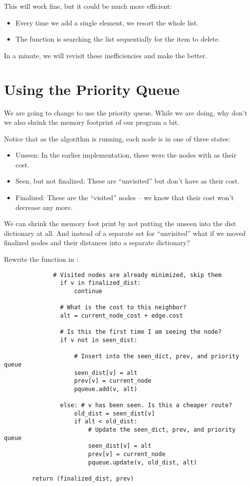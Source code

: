 This will work fine, but it could be much more efficient:
\begin{itemize}
\item Every time we add a single element, we resort the whole list.
\item The function  is searching the list sequentially for the item to delete.
\end{itemize}

In a minute, we will revisit these inefficiencies and make the better.

\section{Using the Priority Queue}

We are going to change  to use the priority
queue. While we are doing, why don't we also shrink the memory
footprint of our program a bit.

Notice that as the algorithm is running, each node is in one of three states:
\begin{itemize}
\item Unseen: In the earlier implementation, these were the nodes with  as their cost.
\item Seen, but not finalized: These are ``unvisited'' but don't have  as their cost.
\item Finalized: These are the ``visited'' nodes -- we know that their cost won't decrease any more.
\end{itemize}

We can shrink the memory foot print by not putting the unseen into the
dist dictionary at all. And instead of a separate set for
``unvisited'' what if we moved finalized nodes and their distances
into a separate dictionary?

Rewrite the  function in :

\begin{verbatim}
              # Visited nodes are already minimized, skip them
                if v in finalized_dist:
                    continue

                # What is the cost to this neighbor?
                alt = current_node_cost + edge.cost

                # Is this the first time I am seeing the node?
                if v not in seen_dist:

                    # Insert into the seen_dict, prev, and priority queue
                    seen_dist[v] = alt
                    prev[v] = current_node
                    pqueue.add(v, alt)

                else: # v has been seen. Is this a cheaper route?
                    old_dist = seen_dist[v]
                    if alt < old_dist:
                        # Update the seen_dict, prev, and priority queue
                        seen_dist[v] = alt
                        prev[v] = current_node
                        pqueue.update(v, old_dist, alt)

        return (finalized_dist, prev)
\end{verbatim}

